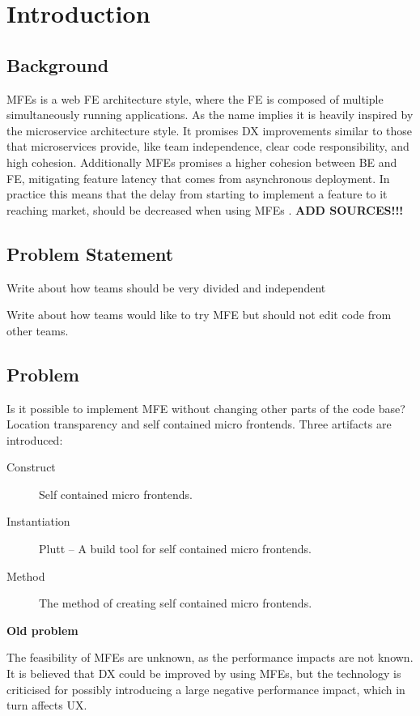 
\chapter{Introduction}

\section{Background}
\acp{MFE} is a web \ac{FE} architecture style, where the \ac{FE} is composed of multiple simultaneously running applications. As the name implies it is heavily inspired by the microservice architecture style. It promises \ac{DX} improvements similar to those that microservices provide, like team independence, clear code responsibility, and high cohesion. Additionally \acp{MFE} promises a higher cohesion between \ac{BE} and \ac{FE}, mitigating feature latency that comes from asynchronous deployment. In practice this means that the delay from starting to implement a feature to it reaching market, should be decreased when using \acp{MFE} \cite{Celik}. \textbf{ADD SOURCES!!!}


\section{Problem Statement}

Write about how teams should be very divided and independent

Write about how teams would like to try \ac{MFE} but should not edit code from other teams.

\section{Problem}

Is it possible to implement \ac{MFE} without changing other parts of the code base? Location transparency and self contained micro frontends. Three artifacts are introduced:

\begin{description}
\item[Construct] Self contained micro frontends.
\item[Instantiation] Plutt -- A build tool for self contained micro frontends.
\item[Method] The method of creating self contained micro frontends.
\end{description}


\textbf{Old problem}

The feasibility of \acp{MFE} are unknown, as the performance impacts are not known. It is believed that \ac{DX} could be improved by using \acp{MFE}, but the technology is criticised for possibly introducing a large negative performance impact, which in turn affects \ac{UX}.


